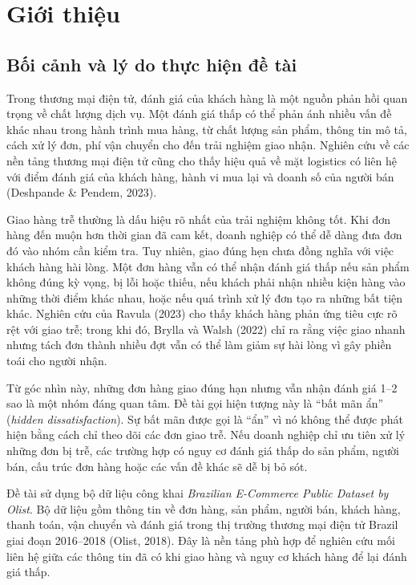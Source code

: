 \chapter{Giới thiệu}
\label{chap:gioi-thieu}

\section{Bối cảnh và lý do thực hiện đề tài}
\label{sec:boi-canh}

Trong thương mại điện tử, đánh giá của khách hàng là một nguồn phản hồi quan trọng về chất lượng dịch vụ. Một đánh giá thấp có thể phản ánh nhiều vấn đề khác nhau trong hành trình mua hàng, từ chất lượng sản phẩm, thông tin mô tả, cách xử lý đơn, phí vận chuyển cho đến trải nghiệm giao nhận. Nghiên cứu về các nền tảng thương mại điện tử cũng cho thấy hiệu quả về mặt logistics có liên hệ với điểm đánh giá của khách hàng, hành vi mua lại và doanh số của người bán (Deshpande \& Pendem, 2023).

Giao hàng trễ thường là dấu hiệu rõ nhất của trải nghiệm không tốt. Khi đơn hàng đến muộn hơn thời gian đã cam kết, doanh nghiệp có thể dễ dàng đưa đơn đó vào nhóm cần kiểm tra. Tuy nhiên, giao đúng hẹn chưa đồng nghĩa với việc khách hàng hài lòng. Một đơn hàng vẫn có thể nhận đánh giá thấp nếu sản phẩm không đúng kỳ vọng, bị lỗi hoặc thiếu, nếu khách phải nhận nhiều kiện hàng vào những thời điểm khác nhau, hoặc nếu quá trình xử lý đơn tạo ra những bất tiện khác. Nghiên cứu của Ravula (2023) cho thấy khách hàng phản ứng tiêu cực rõ rệt với giao trễ; trong khi đó, Brylla và Walsh (2022) chỉ ra rằng việc giao nhanh nhưng tách đơn thành nhiều đợt vẫn có thể làm giảm sự hài lòng vì gây phiền toái cho người nhận.

Từ góc nhìn này, những đơn hàng giao đúng hạn nhưng vẫn nhận đánh giá 1--2 sao là một nhóm đáng quan tâm. Đề tài gọi hiện tượng này là ``bất mãn ẩn'' (\emph{hidden dissatisfaction}). Sự bất mãn được gọi là ``ẩn'' vì nó không thể được phát hiện bằng cách chỉ theo dõi các đơn giao trễ. Nếu doanh nghiệp chỉ ưu tiên xử lý những đơn bị trễ, các trường hợp có nguy cơ đánh giá thấp do sản phẩm, người bán, cấu trúc đơn hàng hoặc các vấn đề khác sẽ dễ bị bỏ sót.

Đề tài sử dụng bộ dữ liệu công khai \emph{Brazilian E-Commerce Public Dataset by Olist}. Bộ dữ liệu gồm thông tin về đơn hàng, sản phẩm, người bán, khách hàng, thanh toán, vận chuyển và đánh giá trong thị trường thương mại điện tử Brazil giai đoạn 2016--2018 (Olist, 2018). Đây là nền tảng phù hợp để nghiên cứu mối liên hệ giữa các thông tin đã có khi giao hàng và nguy cơ khách hàng để lại đánh giá thấp.

